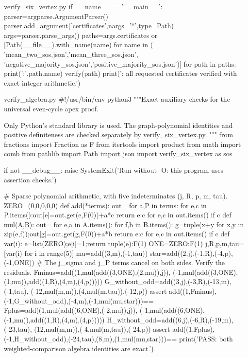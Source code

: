 \begin{filecontents*}[overwrite]{verify_six_vertex.py}
if __name__=='__main__':
    parser=argparse.ArgumentParser()
    parser.add_argument('certificates',nargs='*',type=Path)
    args=parser.parse_args()
    paths=args.certificates or [Path(__file__).with_name(name) for name in (
        'mean_two_sos.json','mean_three_sos.json',
        'negative_majority_sos.json','positive_majority_sos.json')]
    for path in paths:
        print('\nCERTIFICATE:',path.name)
        verify(path)
    print('\nPASS: all requested certificates verified with exact integer arithmetic.')
\end{filecontents*}

\begin{filecontents*}[overwrite]{verify_algebra.py}
#!/usr/bin/env python3
"""Exact auxiliary checks for the universal even-cycle apex proof.

Only Python's standard library is used. The graph-polynomial identities and
positive definiteness are checked separately by verify_six_vertex.py.
"""
from fractions import Fraction as F
from itertools import product
from math import comb
from pathlib import Path
import json
import verify_six_vertex as sos

if not __debug__:
    raise SystemExit('Run without -O: this program uses assertion checks.')

# Sparse polynomial arithmetic, with five indeterminates (j, R, p, m, tau).
ZERO=(0,0,0,0,0)
def add(*terms):
    out={}
    for a,P in terms:
        for e,c in P.items():out[e]=out.get(e,F(0))+a*c
    return {e:c for e,c in out.items() if c}
def mul(A,B):
    out={}
    for e,a in A.items():
        for f,b in B.items():
            g=tuple(x+y for x,y in zip(e,f));out[g]=out.get(g,F(0))+a*b
    return {e:c for e,c in out.items() if c}
def var(i):
    e=list(ZERO);e[i]=1;return {tuple(e):F(1)}
ONE={ZERO:F(1)}
j,R,p,m,tau=[var(i) for i in range(5)]
mu=add((3,m),(-1,tau))
star=add((2,j),(-1,R),(-4,p),(-1,ONE))
# The j_sigma and j_P terms cancel on both sides. Verify the residuals.
Fminus=add((1,mul(add((3,ONE),(2,mu)),j)),
           (-1,mul(add((3,ONE),(1,mu)),add((1,R),(4,m),(4,p)))))
G_without_odd=add((3,j),(-3,R),(-13,m),(-1,tau),
                  (-12,mul(m,m)),(4,mul(m,tau)),(-12,p))
assert add((1,Fminus),(-1,G_without_odd),(-4,m),(-1,mul(mu,star)))=={}
Fplus=add((1,mul(add((6,ONE),(-2,mu)),j)),
          (-1,mul(add((6,ONE),(-1,mu)),add((1,R),(4,m),(4,p)))))
H_without_odd=add((6,j),(-6,R),(-19,m),(-23,tau),
                  (12,mul(m,m)),(-4,mul(m,tau)),(-24,p))
assert add((1,Fplus),(-1,H_without_odd),(-24,tau),(8,m),(1,mul(mu,star)))=={}
print('PASS: both weighted-comparison algebra identities are exact.')


\end{filecontents*}
